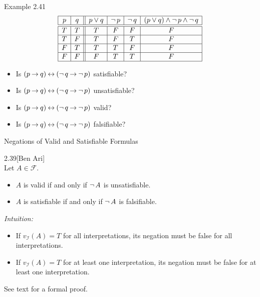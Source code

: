 \begin{wideslide}[bm=,toc=]{Example 2.41}
\begin{displaymath}
\begin{array}{|c|c||c|c|c|c|}
\hline
p & q & p \vee q & \mathop{\neg} p & \mathop{\neg} q &
(p \vee q) \wedge \mathop{\neg} p \wedge \mathop{\neg} q \\ \hline \hline
T & T & T & F & F & F \\ \hline
T & F & T & F & T & F \\ \hline
F & T & T & T & F & F \\ \hline
F & F & F & T & T & F \\ \hline
\end{array}
\end{displaymath}
\begin{itemize}
\item Is $(p\mathbin{\rightarrow} q)\mathbin{\leftrightarrow}  (\mathop{\neg} q\mathbin{\rightarrow} \mathop{\neg} p)$ satisfiable?
\item Is $(p\mathbin{\rightarrow} q)\mathbin{\leftrightarrow}  (\mathop{\neg} q\mathbin{\rightarrow} \mathop{\neg} p)$ unsatisfiable?
\item Is $(p\mathbin{\rightarrow} q)\mathbin{\leftrightarrow}  (\mathop{\neg} q\mathbin{\rightarrow} \mathop{\neg} p)$ valid?
\item Is $(p\mathbin{\rightarrow} q)\mathbin{\leftrightarrow}  (\mathop{\neg} q\mathbin{\rightarrow} \mathop{\neg} p)$ falsifiable?
\end{itemize}
\end{wideslide}

\begin{wideslide}[bm=,toc=]{Negations of Valid and Satisfiable Formulas}
\begin{thm}{2.39}[Ben Ari]
~\\Let $A \in \mathcal{F}$. 
\begin{itemize}
\item $A$ is valid if and only if $\mathop{\neg} A$ is unsatisfiable.
\item $A$ is satisfiable if and only if $\mathop{\neg} A$ is falsifiable.
\end{itemize}
\end{thm}
\emph{Intuition:}
\begin{itemize}
\item If $v_{\mathcal{I}}(A) = T$ for all interpretations, its
negation must be false for all interpretations.
\item If $v_{\mathcal{I}}(A) = T$ for at least one interpretation, its
negation must be false for at least one interpretation.
\end{itemize}
See text for a formal proof.
\end{wideslide}




